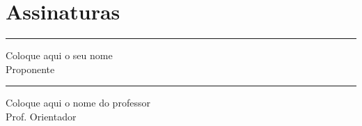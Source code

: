 \documentclass[tcc-proposta]{texufpel}
\begin{document}
\chapter{Assinaturas}
\vspace{2cm}

\begin{center}
\rule{8cm}{.3mm}
\medskip

	Coloque aqui o seu nome\\
	Proponente

\end{center}

\vspace{4cm}

\begin{center}
\rule{8cm}{.3mm}
\medskip

	Coloque aqui o nome do professor\\
	Prof. Orientador

\end{center}
\end{document}
